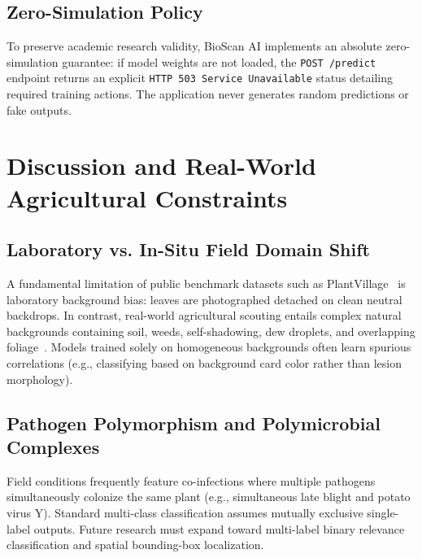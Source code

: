 \documentclass[11pt,a4paper]{article}
\begin{document}
\subsection{Zero-Simulation Policy}
To preserve academic research validity, BioScan AI implements an absolute zero-simulation guarantee: if model weights are not loaded, the \texttt{POST /predict} endpoint returns an explicit \texttt{HTTP 503 Service Unavailable} status detailing required training actions. The application never generates random predictions or fake outputs.

\section{Discussion and Real-World Agricultural Constraints}

\subsection{Laboratory vs. In-Situ Field Domain Shift}
A fundamental limitation of public benchmark datasets such as PlantVillage~\cite{hughes2015open} is laboratory background bias: leaves are photographed detached on clean neutral backdrops. In contrast, real-world agricultural scouting entails complex natural backgrounds containing soil, weeds, self-shadowing, dew droplets, and overlapping foliage~\cite{singh2021plantdoc}. Models trained solely on homogeneous backgrounds often learn spurious correlations (e.g., classifying based on background card color rather than lesion morphology).

\subsection{Pathogen Polymorphism and Polymicrobial Complexes}
Field conditions frequently feature co-infections where multiple pathogens simultaneously colonize the same plant (e.g., simultaneous late blight and potato virus Y). Standard multi-class classification assumes mutually exclusive single-label outputs. Future research must expand toward multi-label binary relevance classification and spatial bounding-box localization.

\end{document}

